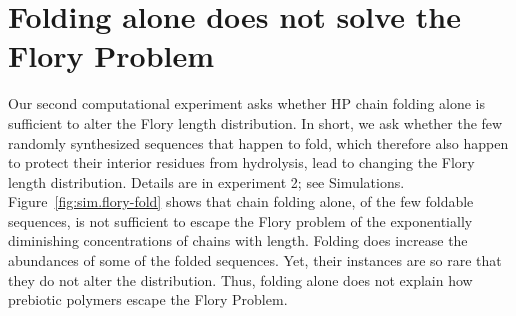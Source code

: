 \documentclass[journal=jacsat,manuscript=article,layout=twocolumn]{achemso}
\begin{document}
\section{Folding alone does not solve the Flory Problem}
Our second computational experiment asks whether HP chain folding alone is sufficient to alter the 
Flory length distribution.  In short, we ask whether the few randomly synthesized sequences that 
happen to fold, which therefore also happen to protect their interior residues from hydrolysis, 
lead 
to changing the Flory length distribution.  Details are in experiment 2; see Simulations. 
Figure~\ref{fig:sim.flory-fold} shows that chain folding alone, of the few foldable sequences, is 
not sufficient to escape the Flory problem of the exponentially diminishing concentrations of 
chains 
with length.  Folding does increase the abundances of some of the folded sequences.  Yet, their 
instances are so rare that they do not alter the distribution.  Thus, folding alone does not 
explain 
how prebiotic polymers escape the Flory Problem.
\end{document}
